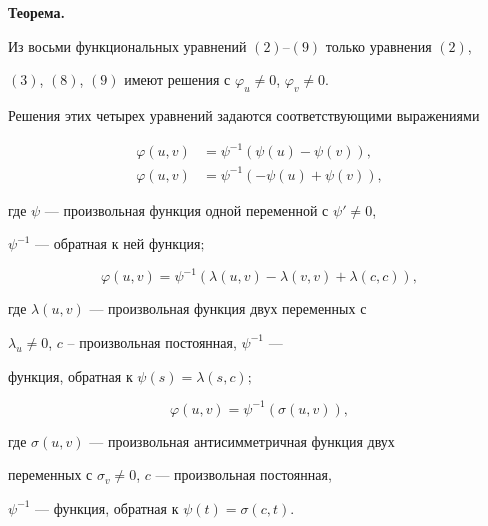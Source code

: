 \medskip 


 


{\bf Теорема.} {\it 


Из восьми функциональных уравнений $(2)$--$(9)$ только уравнения $(2)$, 


$(3)$, $(8)$, $(9)$ имеют решения с $\varphi_u\ne0$, $\varphi_v\ne0$. 


Решения этих четырех уравнений задаются соответствующими выражениями 


\begin{align} 


\varphi(u,v)&=\psi^{-1}(\psi(u)-\psi(v)),\tag{$2'$}\\ 


\varphi(u,v)&=\psi^{-1}(-\psi(u)+\psi(v)),\tag{$3'$} 


\end{align} 


где $\psi$ --- произвольная функция одной переменной с $\psi'\ne0$, 


$\psi^{-1}$ --- обратная к ней функция\/$;$ 


\begin{equation} 


\varphi(u,v)=\psi^{-1}(\lambda(u,v)-\lambda(v,v)+ 


\lambda(c,c)),\tag{$8'$} 


\end{equation} 


где $\lambda(u,v)$ --- произвольная функция двух переменных с 


$\lambda_u\ne0$, $c$ -- произвольная постоянная, $\psi^{-1}$ --- 


функция, обратная к $\psi(s)=\lambda(s,c);$ 


\begin{equation} 


\varphi(u,v)=\psi^{-1}(\sigma(u,v)),\tag{$9'$} 


\end{equation} 


где $\sigma(u,v)$ --- произвольная антисимметричная функция двух 


переменных с $\sigma_v\ne0$, $c$ --- произвольная постоянная, 


$\psi^{-1}$ --- функция, обратная к $\psi(t)=\sigma(c,t)$. 


} 


\medskip 


 


